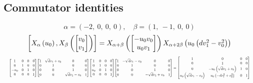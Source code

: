 \documentclass[11pt]{article}
\theoremstyle{definition}
\begin{document}
\subsection{Commutator identities}

\providecommand{\scaletoalign}[2]{%
  \sbox0{$#2$}%
  \ifdim\wd0>#1\relax 
    \resizebox{#1}{!}{\usebox0}%
  \else 
    \usebox0%
  \fi 
}
\[
\alpha = \left( -2, \  0, \  0, \  0\right), \quad \beta = \left( 1, \  -1, \  0, \  0\right)
\]
\[
\scaletoalign{\textwidth}{\left[ X_{\alpha}\left(u_{0}\right), X_{\beta}\left(\left[\begin{matrix}v_{0}\\v_{1}\end{matrix}\right]\right) \right] = X_{\alpha + \beta}\left(\left[\begin{matrix}- u_{0} v_{0}\\u_{0} v_{1}\end{matrix}\right]\right) X_{\alpha + 2\beta}\left(u_{0} \left(d v_{1}^{2} - v_{0}^{2}\right)\right)}
\]
\[
\scaletoalign{\textwidth}{{\left[\begin{matrix}1 & 0 & 0 & 0\\0 & 1 & 0 & 0\\- u_{0} & 0 & 1 & 0\\0 & 0 & 0 & 1\end{matrix}\right]} {\left[\begin{matrix}1 & \sqrt{d} v_{1} + v_{0} & 0 & 0\\0 & 1 & 0 & 0\\0 & 0 & 1 & 0\\0 & 0 & \sqrt{d} v_{1} - v_{0} & 1\end{matrix}\right]} {\left[\begin{matrix}1 & 0 & 0 & 0\\0 & 1 & 0 & 0\\u_{0} & 0 & 1 & 0\\0 & 0 & 0 & 1\end{matrix}\right]} {\left[\begin{matrix}1 & - \sqrt{d} v_{1} - v_{0} & 0 & 0\\0 & 1 & 0 & 0\\0 & 0 & 1 & 0\\0 & 0 & - \sqrt{d} v_{1} + v_{0} & 1\end{matrix}\right]} = {\left[\begin{matrix}1 & 0 & 0 & 0\\0 & 1 & 0 & 0\\0 & - u_{0} \left(\sqrt{d} v_{1} + v_{0}\right) & 1 & 0\\u_{0} \left(\sqrt{d} v_{1} - v_{0}\right) & u_{0} \left(- d v_{1}^{2} + v_{0}^{2}\right) & 0 & 1\end{matrix}\right]}}
\]
\end{document}
